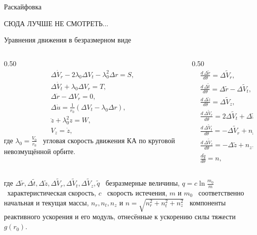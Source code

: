 \documentclass[9pt]{beamer}
\begin{document}
\begin{frame}{Раскайфовка}
\begin{center}
    СЮДА ЛУЧШЕ НЕ СМОТРЕТЬ...
\end{center}
\end{frame}

\begin{frame}{Уравнения движения в безразмерном виде}
\begin{columns}[T,onlytextwidth]
  \begin{column}{0.50\textwidth}
    \begin{gather*}
        \Delta \dot{V}_r - 2 \lambda_0 \Delta V_t - \lambda_0^2 \Delta r = S, \\
        \Delta \dot{V}_t + \lambda_0 \Delta V_r = T, \\
        \Delta \dot{r} - \Delta V_r = 0, \\
        \Delta \dot{u} = \frac{1}{r_0} \left( \Delta V_t - \lambda_0 \Delta r \right), \\
        \ddot{z} + \lambda_0^2 z = W, \\
        V_z = \dot{z},
    \end{gather*}
    где $\lambda_0 = \frac{V_0}{r_0}$ \textemdash\ угловая скорость движения КА по круговой невозмущённой орбите.
  \end{column}

  \begin{column}{0.50\textwidth}
        \begin{align*}
    &\frac{d\,\Delta \tilde r}{d\theta} = \Delta \tilde V_r, \\
    &\frac{d\,\Delta \tilde t}{d\theta} = \Delta \tilde r - \Delta \tilde V_t, \\
    &\frac{d\,\Delta \tilde z}{d\theta} = \Delta \tilde V_z, \\
    &\frac{d\,\Delta \tilde V_r}{d\theta} = 2\Delta \tilde V_t + \Delta \tilde r + n_r, \\
    &\frac{d\,\Delta \tilde V_t}{d\theta} = -\Delta \tilde V_r + n_t, \\
    &\frac{d\,\Delta \tilde V_z}{d\theta} = -\Delta \tilde z + n_z, \\
    &\frac{d \tilde q}{d \theta} = n,
\end{align*}
  \end{column}
\end{columns}
где $\Delta \tilde r, \Delta \tilde t, \Delta \tilde z, \Delta \tilde V_r, \Delta \tilde V_t, \Delta \tilde V_z, \tilde q$ \textemdash\ безразмерные величины, $q = c \ln \frac{m_0}{m}$ \textemdash\ характеристическая скорость, $c$ \textemdash\ скорость истечения, $m$ и $m_0$ \textemdash\ соответственно начальная и текущая массы, $n_r, n_t, n_z$ и $n = \sqrt{n_r^2 + n_t^2 + n_z^2}$ \textemdash\ компоненты реактивного ускорения и его модуль, отнесённые к ускорению силы тяжести $g(r_0)$.
\end{frame}
\end{document}

